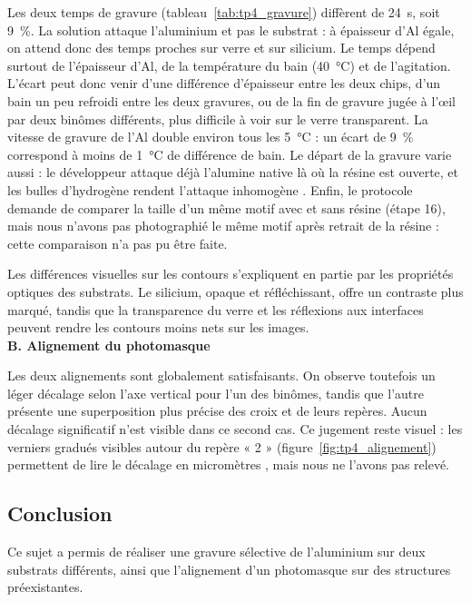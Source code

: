 Les deux temps de gravure (tableau~\ref{tab:tp4_gravure}) diffèrent de \qty{24}{\second}, soit \qty{9}{\percent}. La solution attaque l'aluminium et pas le substrat : à épaisseur d'Al égale, on attend donc des temps proches sur verre et sur silicium. Le temps dépend surtout de l'épaisseur d'Al, de la température du bain (\qty{40}{\celsius}) et de l'agitation. L'écart peut donc venir d'une différence d'épaisseur entre les deux chips, d'un bain un peu refroidi entre les deux gravures, ou de la fin de gravure jugée à l'œil par deux binômes différents, plus difficile à voir sur le verre transparent. La vitesse de gravure de l'Al double environ tous les \qty{5}{\celsius} \cite{alumicro} : un écart de \qty{9}{\percent} correspond à moins de \qty{1}{\celsius} de différence de bain. Le départ de la gravure varie aussi : le développeur attaque déjà l'alumine native là où la résine est ouverte, et les bulles d'hydrogène rendent l'attaque inhomogène \cite{alumicro}. Enfin, le protocole demande de comparer la taille d'un même motif avec et sans résine (étape 16), mais nous n'avons pas photographié le même motif après retrait de la résine : cette comparaison n'a pas pu être faite.

Les différences visuelles sur les contours s'expliquent en partie par les propriétés optiques des substrats. Le silicium, opaque et réfléchissant, offre un contraste plus marqué, tandis que la transparence du verre et les réflexions aux interfaces peuvent rendre les contours moins nets sur les images.
\\

\noindent\textbf{B. Alignement du photomasque}

Les deux alignements sont globalement satisfaisants. On observe toutefois un léger décalage selon l'axe vertical pour l'un des binômes, tandis que l'autre présente une superposition plus précise des croix et de leurs repères. Aucun décalage significatif n'est visible dans ce second cas. Ce jugement reste visuel : les verniers gradués visibles autour du repère « 2 » (figure~\ref{fig:tp4_alignement}) permettent de lire le décalage en micromètres \cite{prot4}, mais nous ne l'avons pas relevé.

\subsection{Conclusion}

Ce sujet a permis de réaliser une gravure sélective de l'aluminium sur deux substrats différents, ainsi que l'alignement d'un photomasque sur des structures préexistantes.
\\

